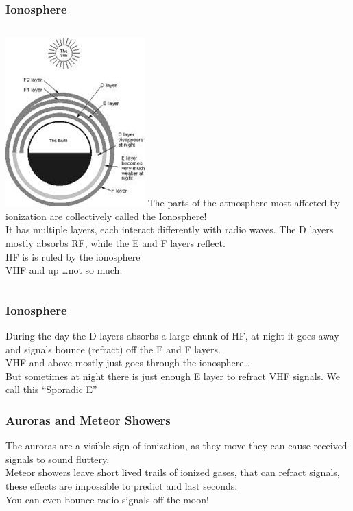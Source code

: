 \documentclass[10pt, handout]{beamer}
\begin{document}
\begin{frame}
\frametitle{Ionosphere}
\begin{columns}
\includegraphics[height=.9\textheight]{ionosphere.png}
The parts of the atmosphere most affected by ionization are collectively called the Ionosphere!\\
It has multiple layers, each interact differently with radio waves. The D layers mostly absorbs RF, while the E and F layers reflect.\\
HF is is ruled by the ionosphere\\ VHF and up \ldots not so much.
\end{columns}
\end{frame}

\begin{frame}
\frametitle{Ionosphere}
During the day the D layers absorbs a large chunk of HF, at night it goes away and signals bounce (refract) off the E and F layers.\\
VHF and above mostly just goes through the ionosphere\ldots\\
But sometimes at night there is just enough E layer to refract VHF signals. We call this ``Sporadic E''
\end{frame}

\begin{frame}
\frametitle{Auroras and Meteor Showers}
The auroras are a visible sign of ionization, as they move they can cause received signals to sound fluttery.\\
Meteor showers leave short lived trails of ionized gases, that can refract signals, these effects are impossible to predict and last seconds.\\
You can even bounce radio signals off the moon!
\end{frame}
\end{document}
